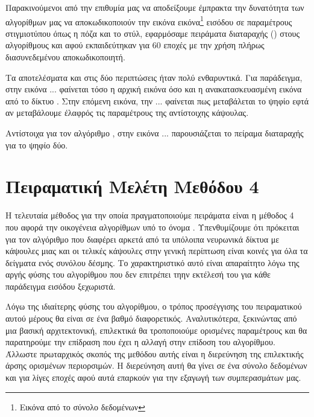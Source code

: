 Παρακινούμενοι από την επιθυμία μας να αποδείξουμε έμπρακτα την δυνατότητα των αλγορίθμων μας να αποκωδικοποιούν την εικόνα εικόνα\footnote{Εικόνα από το σύνολο δεδομένων } εισόδου σε παραμέτρους στιγμιοτύπου όπως η πόζα και το στύλ, εφαρμόσαμε πειράματα διαταραχής () στους αλγορίθμους  και  αφού εκπαιδεύτηκαν για 60 εποχές με την χρήση πλήρως διασυνεδεμένου αποκωδικοποιητή.\par

Τα αποτελέσματα και στις δύο περιπτώσεις ήταν πολύ ενθαρυντικά. Για παράδειγμα, στην εικόνα ... φαίνεται τόσο η αρχική εικόνα όσο και η ανακατασκευασμένη εικόνα από το δίκτυο . Στην επόμενη εικόνα, την ... φαίνεται πως μεταβάλεται το ψηφίο εφτά αν μεταβάλουμε έλαφρός τις παραμέτρους της αντίστοιχης κάψουλας.\par

Αντίστοιχα για τον αλγόριθμο , στην εικόνα ... παρουσιάζεται το πείραμα διαταραχής για το ψηφίο δύο.


\section{Πειραματική Μελέτη Μεθόδου 4}
 
Η τελευταία μέθοδος για την οποία πραγματοποιούμε πειράματα είναι η μέθοδος 4 που αφορά την οικογένεια αλγορίθμων υπό το όνομα . Υπενθυμίζουμε ότι πρόκειται για τον αλγόριθμο που διαφέρει αρκετά από τα υπόλοιπα νευρωνικά δίκτυα με κάψουλες μιας και οι τελικές κάψουλες στην γενική περίπτωση είναι κοινές για όλα τα δείγματα ενός συνόλου δέσμης. Το χαρακτηριστικό αυτό είναι απαραίτητο λόγω της αργής φύσης του αλγορίθμου  που δεν επιτρέπει τηην εκτέλεσή του για κάθε παράδειγμα εισόδου ξεχωριστά.\par

Λόγω της ιδιαίτερης φύσης του αλγορίθμου, ο τρόπος προσέγγισης του πειραματικού αυτού μέρους θα είναι σε ένα βαθμό διαφορετικός. Αναλυτικότερα, ξεκινώντας από μια βασική αρχιτεκτονική, επιλεκτικά θα τροποποιούμε ορισμένες παραμέτρους και θα παρατηρούμε την επίδραση που έχει η αλλαγή στην επίδοση του αλγορίθμου. Άλλωστε πρωταρχικός σκοπός της μεθόδου αυτής είναι η διερεύνηση της επιλεκτικής άρσης ορισμένων περιορσιμών. Η διερεύνηση αυτή θα γίνει σε ένα σύνολο δεδομένων και για λίγες εποχές αφού αυτά επαρκούν για την εξαγωγή των συμπερασμάτων μας.\par

